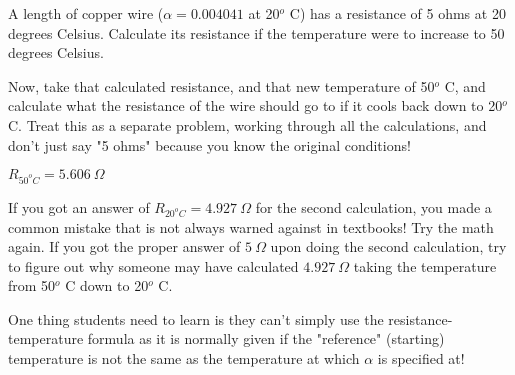 

A length of copper wire ($\alpha = 0.004041$ at 20$^{o}$ C) has a resistance of 5 ohms at 20 degrees Celsius.  Calculate its resistance if the temperature were to increase to 50 degrees Celsius.

\vskip 10pt

Now, take that calculated resistance, and that new temperature of 50$^{o}$ C, and calculate what the resistance of the wire should go to if it cools back down to 20$^{o}$ C.  Treat this as a separate problem, working through all the calculations, and don't just say "5 ohms" because you know the original conditions!







$R_{50^o C} = 5.606 \> \Omega$

\vskip 10pt

If you got an answer of $R_{20^o C} = 4.927 \> \Omega$ for the second calculation, you made a common mistake that is not always warned against in textbooks!  Try the math again.  If you got the proper answer of $5 \> \Omega$ upon doing the second calculation, try to figure out why someone may have calculated $4.927 \> \Omega$ taking the temperature from 50$^{o}$ C down to 20$^{o}$ C.







One thing students need to learn is they can't simply use the resistance-temperature formula as it is normally given if the "reference" (starting) temperature is not the same as the temperature at which $\alpha$ is specified at!





